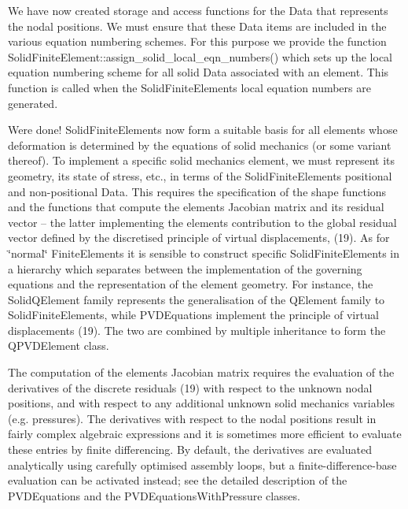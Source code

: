 \begin{DoxyItemize}
\item We have now created storage and access functions for the {\ttfamily Data} that represents the nodal positions. We must ensure that these {\ttfamily Data} items are included in the various equation numbering schemes. For this purpose we provide the function {\ttfamily Solid\+Finite\+Element\+::assign\+\_\+solid\+\_\+local\+\_\+eqn\+\_\+numbers()} which sets up the local equation numbering scheme for all solid {\ttfamily Data} associated with an element. This function is called when the Solid\+Finite\+Element\textquotesingle{}s local equation numbers are generated.
\item We\textquotesingle{}re done! {\ttfamily Solid\+Finite\+Elements} now form a suitable basis for all elements whose deformation is determined by the equations of solid mechanics (or some variant thereof). To implement a specific solid mechanics element, we must represent its geometry, its state of stress, etc., in terms of the {\ttfamily Solid\+Finite\+Element\textquotesingle{}s} positional and non-\/positional {\ttfamily Data}. This requires the specification of the shape functions and the functions that compute the element\textquotesingle{}s Jacobian matrix and its residual vector -- the latter implementing the element\textquotesingle{}s contribution to the global residual vector defined by the discretised principle of virtual displacements, (19). As for \char`\"{}normal\char`\"{} {\ttfamily Finite\+Elements} it is sensible to construct specific {\ttfamily Solid\+Finite\+Elements} in a hierarchy which separates between the implementation of the governing equations and the representation of the element geometry. For instance, the {\ttfamily Solid\+Q\+Element} family represents the generalisation of the {\ttfamily Q\+Element} family to {\ttfamily Solid\+Finite\+Elements}, while {\ttfamily P\+V\+D\+Equations} implement the principle of virtual displacements (19). The two are combined by multiple inheritance to form the {\ttfamily Q\+P\+V\+D\+Element} class.
\item The computation of the element\textquotesingle{}s Jacobian matrix requires the evaluation of the derivatives of the discrete residuals (19) with respect to the unknown nodal positions, and with respect to any additional unknown solid mechanics variables (e.\+g. pressures). The derivatives with respect to the nodal positions result in fairly complex algebraic expressions and it is sometimes more efficient to evaluate these entries by finite differencing. By default, the derivatives are evaluated analytically using carefully optimised assembly loops, but a finite-\/difference-\/base evaluation can be activated instead; see the detailed description of the {\ttfamily P\+V\+D\+Equations} and the {\ttfamily P\+V\+D\+Equations\+With\+Pressure} classes.
\end{DoxyItemize}



